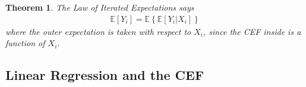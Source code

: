 \documentclass[12pt]{article}
\theoremstyle{plain}
\newtheorem{thm}{Theorem}[section]
\theoremstyle{definition}
\theoremstyle{remark}
\begin{document}
\begin{thm}
The \emph{Law of Iterated Expectations} says
\begin{align*}
  \mathbb{E}[Y_i] = \mathbb{E}\left\{\mathbb{E}[Y_i|X_i]\right\}
\end{align*}
where the outer expectation is taken with respect to $X_i$, since the
CEF inside is a function of $X_i$.
\end{thm}

\subsection{Linear Regression and the CEF}







\end{document}
